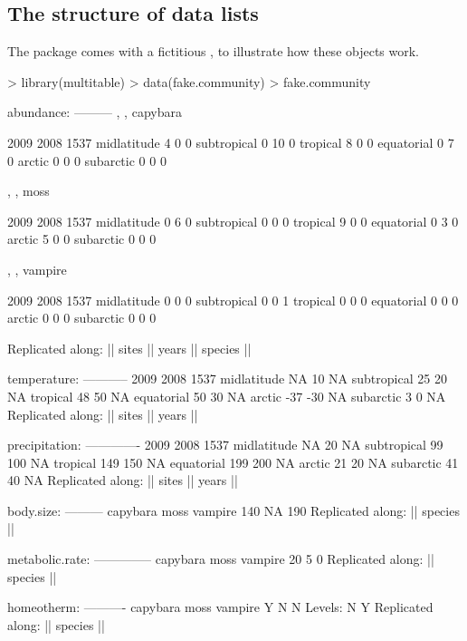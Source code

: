 \documentclass[a4paper]{report}
\begin{document}
\begin{article}
\section{The structure of data lists}

The  package comes with a fictitious , to illustrate how these objects work.
\begin{Schunk}
\begin{Sinput}
> library(multitable)
> data(fake.community)
> fake.community
\end{Sinput}
\begin{Soutput}
abundance:
---------
, , capybara

            2009 2008 1537
midlatitude    4    0    0
subtropical    0   10    0
tropical       8    0    0
equatorial     0    7    0
arctic         0    0    0
subarctic      0    0    0

, , moss

            2009 2008 1537
midlatitude    0    6    0
subtropical    0    0    0
tropical       9    0    0
equatorial     0    3    0
arctic         5    0    0
subarctic      0    0    0

, , vampire

            2009 2008 1537
midlatitude    0    0    0
subtropical    0    0    1
tropical       0    0    0
equatorial     0    0    0
arctic         0    0    0
subarctic      0    0    0

Replicated along:  || sites || years || species || 


temperature:
-----------
            2009 2008 1537
midlatitude   NA   10   NA
subtropical   25   20   NA
tropical      48   50   NA
equatorial    50   30   NA
arctic       -37  -30   NA
subarctic      3    0   NA
Replicated along:  || sites || years || 


precipitation:
-------------
            2009 2008 1537
midlatitude   NA   20   NA
subtropical   99  100   NA
tropical     149  150   NA
equatorial   199  200   NA
arctic        21   20   NA
subarctic     41   40   NA
Replicated along:  || sites || years || 


body.size:
---------
capybara     moss  vampire 
     140       NA      190 
Replicated along:  || species || 


metabolic.rate:
--------------
capybara     moss  vampire 
      20        5        0 
Replicated along:  || species || 


homeotherm:
----------
capybara     moss  vampire 
       Y        N        N 
Levels: N Y
Replicated along:  || species || 



\end{Soutput}
\end{Schunk}
\end{article}
\end{document}
